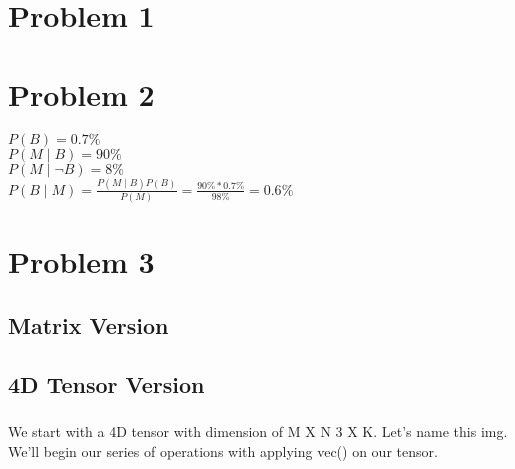 \documentclass{article}
\begin{document}
\section{Problem 1}
	\subsection{} %
	\subsection{} %
	\subsection{} %

\section {Problem 2}
	$P(B) = 0.7\%$\\
	$P(M \mid B) = 90\%$\\
	$P(M \mid \neg B) = 8\%$\\
	$P(B \mid M)  = \frac{P(M \mid B) P(B)}{P(M)} = \frac{90\% * 0.7\%}{98\%} = \mathbf{0.6\%}$

\section {Problem 3}
	\subsection{Matrix Version} %
		\subsubsection{} %

		\subsubsection{} %

	\subsection{4D Tensor Version} %
		\subsubsection{} %
		We start with a 4D tensor with dimension of M X N 3 X K. Let's name this img. 
		We'll begin our series of operations with applying vec() on our tensor.\\
\end{document}
